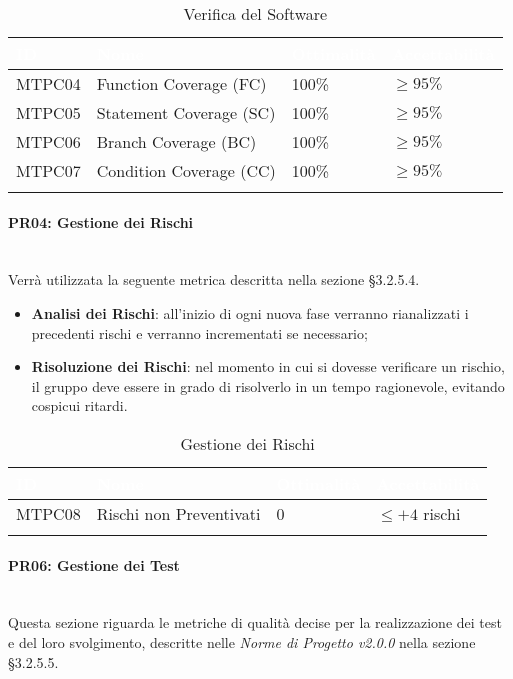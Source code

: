 \begin{longtable}{|C{.15\textwidth}|C{.24\textwidth}|C{.24\textwidth}|C{.24\textwidth}|}
\hline
{}\textbf{\textcolor{white}{ID}} & \textbf{\textcolor{white}{Nome}} & \textbf{\textcolor{white}{Ottimalità}} & \textbf{\textcolor{white}{Accettabilità}}\\
\hline \hline
\endhead
MTPC04 & Function Coverage (FC) & 100\% & $\geqslant 95\%$ \\
\hline
{} MTPC05 & Statement Coverage (SC) & 100\% & $\geqslant 95\%$ \\
\hline
MTPC06 & Branch Coverage (BC) & 100\% & $\geqslant 95\%$ \\
\hline
{}MTPC07 & Condition Coverage (CC) & 100\% & $\geqslant 95\%$ \\
\hline
\caption{Verifica del Software}
\label{VerificaSoftware}
\end{longtable}

\paragraph{PR04: Gestione dei Rischi}\-\\
Verrà utilizzata la seguente metrica descritta nella sezione §3.2.5.4.
\begin{itemize}
	\item \textbf{Analisi dei Rischi}: all'inizio di ogni nuova fase verranno rianalizzati i precedenti rischi e verranno incrementati se necessario;
	\item \textbf{Risoluzione dei Rischi}: nel momento in cui si dovesse verificare un rischio, il gruppo deve essere in grado di risolverlo in un tempo ragionevole, evitando cospicui ritardi.
\end{itemize}

\begin{longtable}{|C{.15\textwidth}|C{.24\textwidth}|C{.24\textwidth}|C{.24\textwidth}|}
\hline
{}\textbf{\textcolor{white}{ID}} & \textbf{\textcolor{white}{Nome}} & \textbf{\textcolor{white}{Ottimalità}} & \textbf{\textcolor{white}{Accettabilità}}\\
\hline \hline
\endhead
MTPC08 & Rischi non Preventivati & 0 & $ \leqslant +4$ rischi \\
\hline
\caption{Gestione dei Rischi}
\label{GestioneRischi}
\end{longtable}


\paragraph{PR06: Gestione dei Test}\-\\
Questa sezione riguarda le metriche di qualità decise per la realizzazione dei test e del loro svolgimento, descritte nelle \textit{Norme di Progetto v2.0.0} nella sezione §3.2.5.5.

